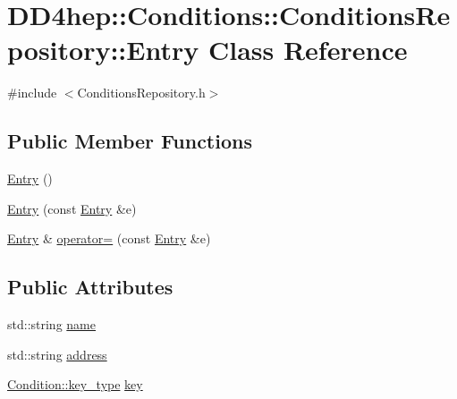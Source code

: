 \hypertarget{class_d_d4hep_1_1_conditions_1_1_conditions_repository_1_1_entry}{
\section{DD4hep::Conditions::ConditionsRepository::Entry Class Reference}
\label{class_d_d4hep_1_1_conditions_1_1_conditions_repository_1_1_entry}
}


{\ttfamily \#include $<$ConditionsRepository.h$>$}\subsection*{Public Member Functions}
\begin{DoxyCompactItemize}
\item 
\hyperlink{class_d_d4hep_1_1_conditions_1_1_conditions_repository_1_1_entry_a4b5b7b66f05263698a5f95afacf50c2d}{Entry} ()
\item 
\hyperlink{class_d_d4hep_1_1_conditions_1_1_conditions_repository_1_1_entry_ae83cae74d588480e3e142c54fb198dc5}{Entry} (const \hyperlink{class_d_d4hep_1_1_conditions_1_1_conditions_repository_1_1_entry}{Entry} \&e)
\item 
\hyperlink{class_d_d4hep_1_1_conditions_1_1_conditions_repository_1_1_entry}{Entry} \& \hyperlink{class_d_d4hep_1_1_conditions_1_1_conditions_repository_1_1_entry_a6d1dd37eaf5e954821998aaa3daa42a3}{operator=} (const \hyperlink{class_d_d4hep_1_1_conditions_1_1_conditions_repository_1_1_entry}{Entry} \&e)
\end{DoxyCompactItemize}
\subsection*{Public Attributes}
\begin{DoxyCompactItemize}
\item 
std::string \hyperlink{class_d_d4hep_1_1_conditions_1_1_conditions_repository_1_1_entry_a72388605da0e0b2ec2bafa344776f967}{name}
\item 
std::string \hyperlink{class_d_d4hep_1_1_conditions_1_1_conditions_repository_1_1_entry_a6a105e657ab13c08b36b5e0e5be73deb}{address}
\item 
\hyperlink{class_d_d4hep_1_1_conditions_1_1_condition_a7528efa762e8cc072ef80ea67c3531f9}{Condition::key\_\-type} \hyperlink{class_d_d4hep_1_1_conditions_1_1_conditions_repository_1_1_entry_a2dff42077683b05077ecebdd3f4e1e0d}{key}
\end{DoxyCompactItemize}


